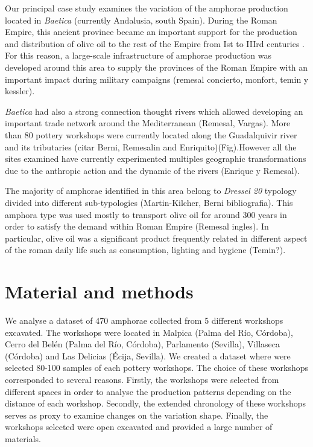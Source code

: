 \documentclass[review]{elsarticle}
\begin{document}
Our principal case study examines the variation of the amphorae production located in \emph{Baetica} (currently Andalusia, south Spain). During the Roman Empire, this ancient province became an important support for the production and distribution of  olive oil to the rest of the Empire from Ist to IIIrd centuries \cite{rodriguez_baetican_1998}. For this reason, a large-scale infrastructure of amphorae production was developed around this area to supply the provinces of the Roman Empire with an important impact during military campaigns (remesal concierto, monfort, temin y kessler).

\emph{Baetica} had also a strong connection thought rivers which allowed developing an important trade network around the Mediterranean (Remesal, Vargas). More than 80 pottery workshops were currently located along the Guadalquivir river and its tributaries (citar Berni, Remesalin and Enriquito)(Fig).However all the sites examined have currently experimented multiples geographic transformations due to the anthropic action and the dynamic of the rivers (Enrique y Remesal). 

The majority of amphorae identified in this area belong to \emph{Dressel 20} typology divided into different sub-typologies (Martin-Kilcher, Berni bibliografia). This amphora type was used mostly to transport olive oil for around 300 years in order to satisfy the demand within Roman Empire (Remesal ingles). In particular, olive oil was a significant product frequently related in different aspect of the roman daily life such as consumption, lighting and hygiene (Temin?).




\section{Material and methods}

We analyse a dataset of 470 amphorae collected from 5 different workshops excavated. The workshops were located in Malpica (Palma del R\'io, C\'ordoba), Cerro del Bel\'en (Palma del R\'io, C\'ordoba), Parlamento (Sevilla), Villaseca (C\'ordoba) and Las Delicias (\'Ecija, Sevilla). We created a dataset where were selected 80-100 samples of each pottery workshops. The choice of these workshops corresponded to several reasons. Firstly, the workshops were selected from different spaces in order to analyse the production patterns depending on the distance of each workshop. Secondly, the extended chronology of these workshops serves as proxy to examine changes on the variation shape. Finally, the workshops selected were open excavated and provided a large number of materials.   
\end{document}
